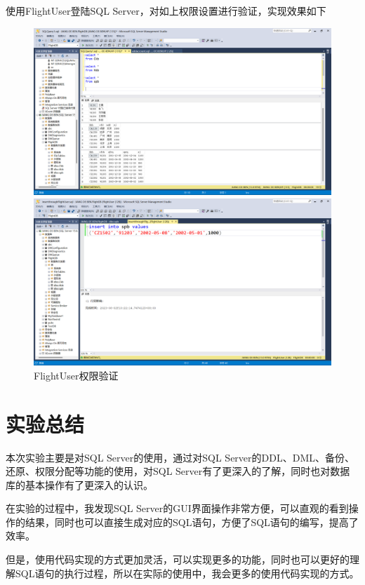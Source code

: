 \documentclass[UTF8,12pt]{article}
\begin{document}
使用FlightUser登陆SQL Server，对如上权限设置进行验证，实现效果如下
\begin{figure}[htbp]
    \centering
    \begin{minipage}{0.8\linewidth}
        \centering
        \includegraphics[width=0.9\linewidth]{img/15.png}
    \end{minipage}
    \begin{minipage}{0.8\linewidth}
        \centering
        \includegraphics[width=0.9\linewidth]{img/16.png}
    \end{minipage}
    \caption{FlightUser权限验证}
\end{figure}

\section{实验总结}
本次实验主要是对SQL Server的使用，通过对SQL Server的DDL、DML、备份、还原、权限分配等功能的使用，对SQL Server有了更深入的了解，同时也对数据库的基本操作有了更深入的认识。

在实验的过程中，我发现SQL Server的GUI界面操作非常方便，可以直观的看到操作的结果，同时也可以直接生成对应的SQL语句，方便了SQL语句的编写，提高了效率。

但是，使用代码实现的方式更加灵活，可以实现更多的功能，同时也可以更好的理解SQL语句的执行过程，所以在实际的使用中，我会更多的使用代码实现的方式。
















    
\end{document}
